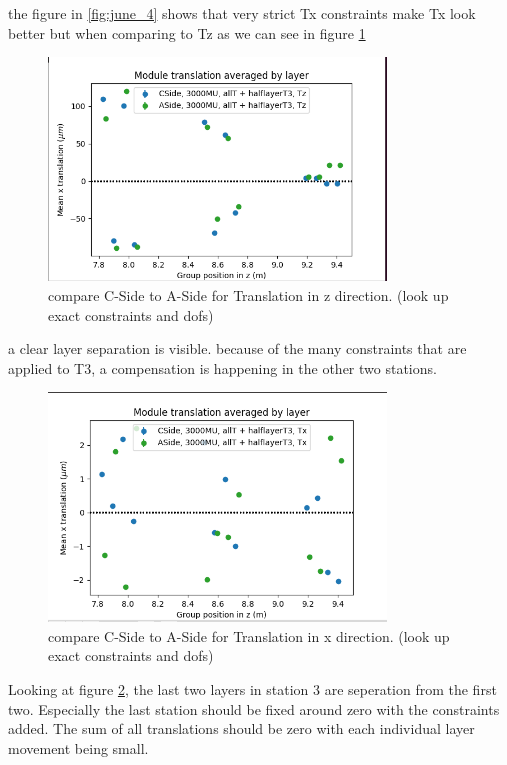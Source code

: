 the figure in \ref{fig:june_4} shows that very strict Tx constraints make Tx look better but when comparing to Tz as we can see in figure \ref{fig:june_5}
\begin{figure}
  \centering
  \includegraphics[width=0.8\textwidth]{plots/june_21/CA_allT_halfT3_Tz.png}
  \caption{compare C-Side to A-Side for Translation in z direction. (look up exact constraints and dofs)}
  \label{fig:june_5}
\end{figure}
a clear layer separation is visible. because of the many constraints that are applied to T3, a compensation is happening in the other two stations.

\begin{figure}
  \centering
  \includegraphics[width=0.8\textwidth]{plots/june_21/CA_allT_halfT3_Tx.png}
  \caption{compare C-Side to A-Side for Translation in x direction. (look up exact constraints and dofs)}
  \label{fig:june_6}
\end{figure}

Looking at figure \ref{fig:june_6}, the last two layers in station 3 are seperation from the first two. Especially the last station should be fixed around zero with the constraints added. The sum of all translations should be zero with each individual layer movement being small.

